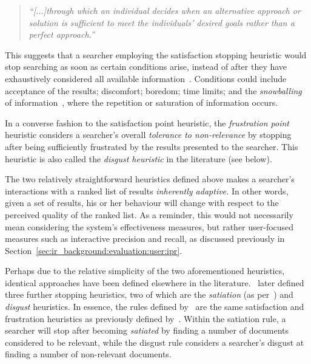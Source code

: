 \begin{quote}
    \emph{``[...]through which an individual decides when an alternative approach or solution is sufficient to meet the individuals' desired goals rather than a perfect approach.''}
\end{quote}

This suggests that a searcher employing the satisfaction stopping heuristic would stop searching as soon as certain conditions arise, instead of after they have exhaustively considered all available information~\citep{march1994primer}. Conditions could include acceptance of the results; discomfort; boredom; time limits; and the \emph{snowballing} of information~\citep{mansourian2007search}, where the repetition or saturation of information occurs.

In a converse fashion to the satisfaction point heuristic, the \emph{frustration point} heuristic considers a searcher's overall \emph{tolerance to non-relevance} by stopping after being sufficiently frustrated by the results presented to the searcher. This heuristic is also called the \emph{disgust heuristic} in the literature (see below).

The two relatively straightforward heuristics defined above makes a searcher's interactions with a ranked list of results \emph{inherently adaptive.} In other words, given a set of results, his or her behaviour will change with respect to the perceived quality of the ranked list. As a reminder, this would not necessarily mean considering the system's effectiveness measures, but rather user-focused measures such as interactive precision and recall, as discussed previously in Section~\ref{sec:ir_background:evaluation:user:ipr}.

Perhaps due to the relative simplicity of the two aforementioned heuristics, identical approaches have been defined elsewhere in the literature.~\cite{kraft1979stopping_rules} later defined three further stopping heuristics, two of which are the \emph{satiation} (as per~\cite{simon1955satiation}) and \emph{disgust} heuristics. In essence, the rules defined by~\cite{kraft1979stopping_rules} are the same satisfaction and frustration heuristics as previously defined by~\cite{cooper1973retrieval_effectiveness_ii}. Within the satiation rule, a searcher will stop after becoming \emph{satiated} by finding a number of documents considered to be relevant, while the disgust rule considers a searcher's disgust at finding a number of non-relevant documents.

